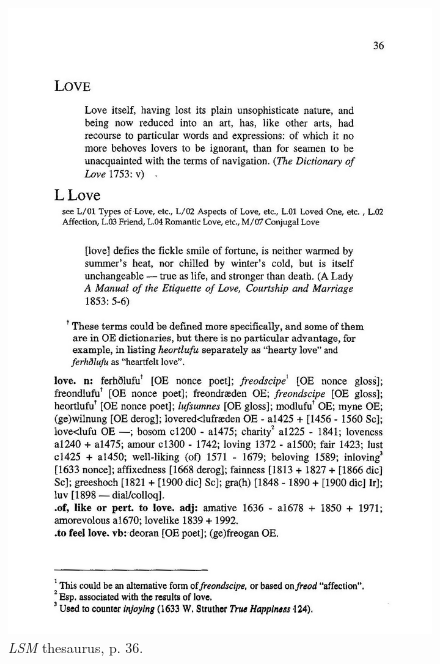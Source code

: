 \begin{figure}[htbp]
  \centering
    \includegraphics[width=\linewidth]{Stolk_thes-content/fig/thes/LSM-p036.jpg}
  \caption{\textit{LSM} thesaurus, p. 36.}
  \label{fig:1.A:LSM:thesaurus}
\end{figure}

